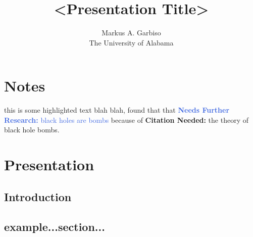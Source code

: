 \documentclass{article}
\title{<Presentation Title>} %
\author{Markus A. Garbiso \\ The University of Alabama} %
\newcommand{\lf}[1]{\textcolor{RoyalBlue}{{\bf Needs Further Research:} #1}}
\newcommand{\cn}[1]{\textcolor{WildStrawberry}{{\bf Citation Needed:} #1}}
\begin{document}
\maketitle

\section{Notes}

this is some highlighted text blah blah, found that that \lf{black holes are bombs} because of \cn{the theory of black hole bombs}.

\section{Presentation}

\subsection{Introduction}

\subsection{example...section...}
\end{document}

